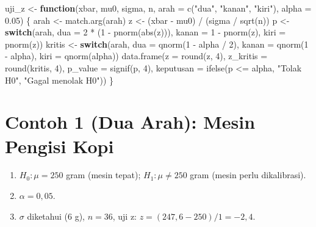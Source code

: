 \documentclass[
  indonesian,
  letterpaper,
]{book}
\newenvironment{Shaded}{\begin{snugshade}}{\end{snugshade}}
\newcommand{\AttributeTok}[1]{\textcolor[rgb]{0.40,0.45,0.13}{#1}}
\newcommand{\ControlFlowTok}[1]{\textcolor[rgb]{0.00,0.23,0.31}{\textbf{#1}}}
\newcommand{\DecValTok}[1]{\textcolor[rgb]{0.68,0.00,0.00}{#1}}
\newcommand{\FloatTok}[1]{\textcolor[rgb]{0.68,0.00,0.00}{#1}}
\newcommand{\FunctionTok}[1]{\textcolor[rgb]{0.28,0.35,0.67}{#1}}
\newcommand{\NormalTok}[1]{\textcolor[rgb]{0.00,0.23,0.31}{#1}}
\newcommand{\OtherTok}[1]{\textcolor[rgb]{0.00,0.23,0.31}{#1}}
\newcommand{\SpecialCharTok}[1]{\textcolor[rgb]{0.37,0.37,0.37}{#1}}
\newcommand{\StringTok}[1]{\textcolor[rgb]{0.13,0.47,0.30}{#1}}
\providecommand{\tightlist}{%
  \setlength{\itemsep}{0pt}\setlength{\parskip}{0pt}}
\begin{document}
\begin{Shaded}
\begin{Highlighting}[]
\NormalTok{uji\_z }\OtherTok{\textless{}{-}} \ControlFlowTok{function}\NormalTok{(xbar, mu0, sigma, n, }\AttributeTok{arah =} \FunctionTok{c}\NormalTok{(}\StringTok{"dua"}\NormalTok{, }\StringTok{"kanan"}\NormalTok{, }\StringTok{"kiri"}\NormalTok{), }\AttributeTok{alpha =} \FloatTok{0.05}\NormalTok{) \{}
\NormalTok{  arah }\OtherTok{\textless{}{-}} \FunctionTok{match.arg}\NormalTok{(arah)}
\NormalTok{  z }\OtherTok{\textless{}{-}}\NormalTok{ (xbar }\SpecialCharTok{{-}}\NormalTok{ mu0) }\SpecialCharTok{/}\NormalTok{ (sigma }\SpecialCharTok{/} \FunctionTok{sqrt}\NormalTok{(n))}
\NormalTok{  p }\OtherTok{\textless{}{-}} \ControlFlowTok{switch}\NormalTok{(arah, }\AttributeTok{dua =} \DecValTok{2} \SpecialCharTok{*}\NormalTok{ (}\DecValTok{1} \SpecialCharTok{{-}} \FunctionTok{pnorm}\NormalTok{(}\FunctionTok{abs}\NormalTok{(z))), }\AttributeTok{kanan =} \DecValTok{1} \SpecialCharTok{{-}} \FunctionTok{pnorm}\NormalTok{(z), }\AttributeTok{kiri =} \FunctionTok{pnorm}\NormalTok{(z))}
\NormalTok{  kritis }\OtherTok{\textless{}{-}} \ControlFlowTok{switch}\NormalTok{(arah, }\AttributeTok{dua =} \FunctionTok{qnorm}\NormalTok{(}\DecValTok{1} \SpecialCharTok{{-}}\NormalTok{ alpha }\SpecialCharTok{/} \DecValTok{2}\NormalTok{), }\AttributeTok{kanan =} \FunctionTok{qnorm}\NormalTok{(}\DecValTok{1} \SpecialCharTok{{-}}\NormalTok{ alpha), }\AttributeTok{kiri =} \FunctionTok{qnorm}\NormalTok{(alpha))}
  \FunctionTok{data.frame}\NormalTok{(}\AttributeTok{z =} \FunctionTok{round}\NormalTok{(z, }\DecValTok{4}\NormalTok{), }\AttributeTok{z\_kritis =} \FunctionTok{round}\NormalTok{(kritis, }\DecValTok{4}\NormalTok{), }\AttributeTok{p\_value =} \FunctionTok{signif}\NormalTok{(p, }\DecValTok{4}\NormalTok{),}
             \AttributeTok{keputusan =} \FunctionTok{ifelse}\NormalTok{(p }\SpecialCharTok{\textless{}=}\NormalTok{ alpha, }\StringTok{"Tolak H0"}\NormalTok{, }\StringTok{"Gagal menolak H0"}\NormalTok{))}
\NormalTok{\}}
\end{Highlighting}
\end{Shaded}

\section{Contoh 1 (Dua Arah): Mesin Pengisi
Kopi}\label{contoh-1-dua-arah-mesin-pengisi-kopi}

\begin{enumerate}
\def\labelenumi{\arabic{enumi}.}
\tightlist
\item
  \(H_0: \mu = 250\) gram (mesin tepat); \(H_1: \mu \ne 250\) gram
  (mesin perlu dikalibrasi).
\item
  \(\alpha = 0{,}05\).
\item
  \(\sigma\) diketahui (6 g), \(n = 36\), uji z:
  \(z = (247{,}6 - 250)/1 = -2{,}4\).
\end{enumerate}
\end{document}
